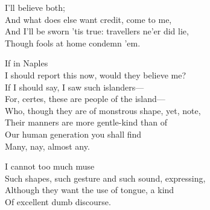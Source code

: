 \begin{verse_speech}[Antonio] 
I'll believe both;\\
And what does else want credit, come to me,\\
And I'll be sworn 'tis true: travellers ne'er did lie,\\
Though fools at home condemn 'em.
\end{verse_speech}

\begin{verse_speech}[Gonzalo] 
If in Naples\\
I should report this now, would they believe me?\\
If I should say, I saw such islanders—\\
For, certes, these are people of the island—\\
Who, though they are of monstrous shape, yet, note,\\
Their manners are more gentle-kind than of\\
Our human generation you shall find\\
Many, nay, almost any.
\end{verse_speech}


\begin{verse_speech}[Prospero]
\end{verse_speech}


\begin{verse_speech}[Alonso] 
I cannot too much muse\\
Such shapes, such gesture and such sound, expressing,\\
Although they want the use of tongue, a kind\\
Of excellent dumb discourse.
\end{verse_speech}



